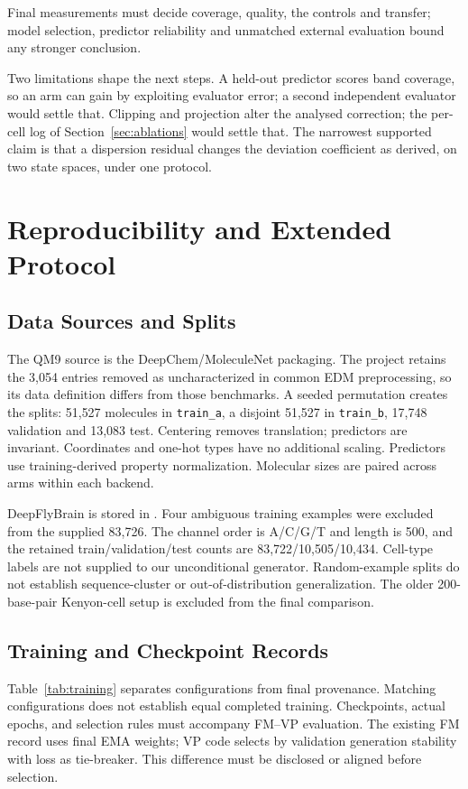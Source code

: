 \documentclass{article}
\begin{document}
Final measurements must decide coverage, quality, the controls and transfer; model selection, predictor reliability and unmatched external evaluation bound any stronger conclusion.

Two limitations shape the next steps. A held-out predictor scores band coverage, so an arm can gain by exploiting evaluator error; a second independent evaluator would settle that. Clipping and projection alter the analysed correction; the per-cell log of Section~\ref{sec:ablations} would settle that. The narrowest supported claim is that a dispersion residual changes the deviation coefficient as derived, on two state spaces, under one protocol.
\clearpage


\clearpage
\appendix
\renewcommand{\thetable}{S\arabic{table}}
\setcounter{table}{0}
\renewcommand{\thefigure}{S\arabic{figure}}
\setcounter{figure}{0}
\section{Reproducibility and Extended Protocol}
\subsection{Data Sources and Splits}\label{app:data}
The QM9 source is the DeepChem/MoleculeNet packaging. The project retains the 3{,}054 entries removed as uncharacterized in common EDM preprocessing, so its data definition differs from those benchmarks. A seeded permutation creates the splits: 51{,}527 molecules in \texttt{train\_a}, a disjoint 51{,}527 in \texttt{train\_b}, 17{,}748 validation and 13{,}083 test. Centering removes translation; predictors are invariant. Coordinates and one-hot types have no additional scaling. Predictors use training-derived property normalization. Molecular sizes are paired across arms within each backend.

DeepFlyBrain is stored in . Four ambiguous training examples were excluded from the supplied 83{,}726. The channel order is A/C/G/T and length is 500, and the retained train/validation/test counts are 83{,}722/10{,}505/10{,}434. Cell-type labels are not supplied to our unconditional generator. Random-example splits do not establish sequence-cluster or out-of-distribution generalization. The older 200-base-pair Kenyon-cell setup is excluded from the final comparison.

\subsection{Training and Checkpoint Records}\label{app:training}
Table~\ref{tab:training} separates configurations from final provenance. Matching configurations does not establish equal completed training. Checkpoints, actual epochs, and selection rules must accompany FM--VP evaluation. The existing FM record uses final EMA weights; VP code selects by validation generation stability with loss as tie-breaker. This difference must be disclosed or aligned before selection.
\end{document}
